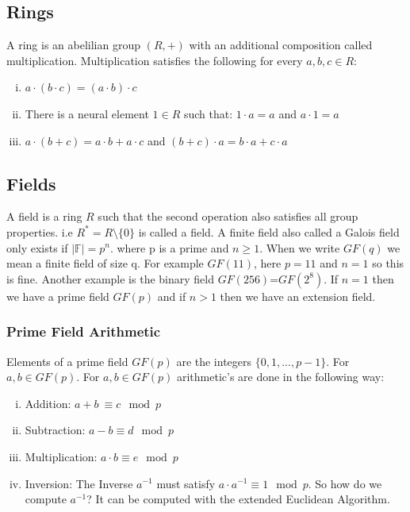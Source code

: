 \subsection{Rings}
A ring is an abelilian group $(R, +)$ with an additional composition called multiplication. Multiplication satisfies the following for every $a,b,c \in R$: 

\begin{enumerate}[(i)]
    \item $a \cdot (b \cdot c) = (a \cdot b) \cdot c$
    \item There is a neural element $1 \in R$ such that: $1 \cdot a = a$ and $a \cdot 1 = a$ 
    \item $a \cdot (b + c) = a \cdot b + a \cdot c$ and $(b + c) \cdot a = b \cdot a + c \cdot a$ 
\end{enumerate}

\subsection{Fields}

A field is a ring $R$ such that the second operation also satisfies all group properties. i.e $R^* = R \setminus \{0\}$ is called a field. A finite field also called a Galois field only exists if $|\mathbb{F}| = p^n$. where p is a prime and $n \geq 1$. When we write $GF(q)$ we mean a finite field of size q. For example $GF(11)$, here $p=11$ and $n=1$ so this is fine. Another example is the binary field $GF(256)$=$GF(2^8)$. If $n=1$ then we have a prime field $GF(p)$ and if $n > 1$ then we have an extension field. 

\subsubsection{Prime Field Arithmetic}  
 Elements of a prime field $GF(p)$ are the integers $\{0,1,...,p-1\}$. For $a,b \in GF(p)$. For $a,b \in GF(p)$ arithmetic's are done in the following way:

\begin{enumerate}[(i)]
    \item Addition: $a+b\ \equiv c \mod p$
    \item Subtraction: $a-b \equiv d \mod p$
    \item Multiplication: $a \cdot b \equiv e \mod p$
    \item Inversion: The Inverse $a^{-1}$ must satisfy $a \cdot a^{-1} \equiv 1 \mod p$. So how do we compute $a^{-1}$? It can be computed with the extended Euclidean Algorithm.
\end{enumerate}

